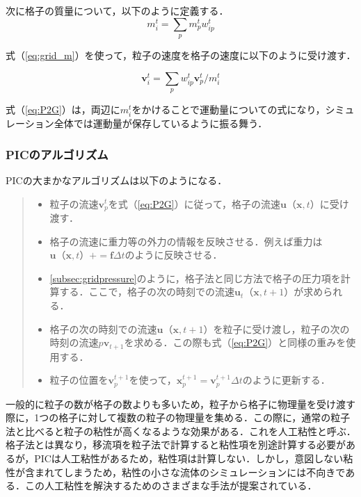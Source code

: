 \documentclass[a4j,12pt]{jreport}
\begin{document}
次に格子の質量について，以下のように定義する．
\begin{equation}\label{eq:grid_m}
m^t_i = \sum\limits_p m^t_pw^t_{ip}
\end{equation} 

式（\ref{eq:grid_m}）を使って，粒子の速度を格子の速度に以下のように受け渡す．

\begin{equation}\label{eq:P2G}
\bm{v}^t_i = \sum\limits_p w^t_{ip}\bm{v}^t_p / m^t_i
\end{equation} 

式（\ref{eq:P2G}）は，両辺に$m^t_i$をかけることで運動量についての式になり，シミュレーション全体では運動量が保存しているように振る舞う．

\subsubsection{PICのアルゴリズム} \label{subsec:PIC_algo}
PICの大まかなアルゴリズムは以下のようになる．
\begin{quote}
	\begin{itemize}
		\item 粒子の流速$\bm{v}^{t}_p$を式（\ref{eq:P2G}）に従って，格子の流速$\bm{u}（\bm{x},t）$に受け渡す．
		\item 格子の流速に重力等の外力の情報を反映させる．例えば重力は$\bm{u}（\bm{x},t） += \bm{f}\varDelta t$のように反映させる．
		\item \ref{subsec:gridpressure}のように，格子法と同じ方法で格子の圧力項を計算する．ここで，格子の次の時刻での流速$\bm{u}_t（\bm{x},t+1）$が求められる．
		\item 格子の次の時刻での流速$\bm{u}（\bm{x},t+1）$を粒子に受け渡し，粒子の次の時刻の流速$p\bm{v}_{t+1}$を求める．この際も式（\ref{eq:P2G}）と同様の重みを使用する．
		\item 粒子の位置を$\bm{v}^{t+1}_p$を使って，$\bm{x}^{t+1}_p = \bm{v}^{t+1}_p\varDelta t $のように更新する．
	\end{itemize}
\end{quote}

一般的に粒子の数が格子の数よりも多いため，粒子から格子に物理量を受け渡す際に，1つの格子に対して複数の粒子の物理量を集める．この際に，通常の粒子法と比べると粒子の粘性が高くなるような効果がある．これを人工粘性と呼ぶ．格子法とは異なり，移流項を粒子法で計算すると粘性項を別途計算する必要があるが，PICは人工粘性があるため，粘性項は計算しない．しかし，意図しない粘性が含まれてしまうため，粘性の小さな流体のシミュレーションには不向きである．この人工粘性を解決するためのさまざまな手法が提案されている．
\end{document}
